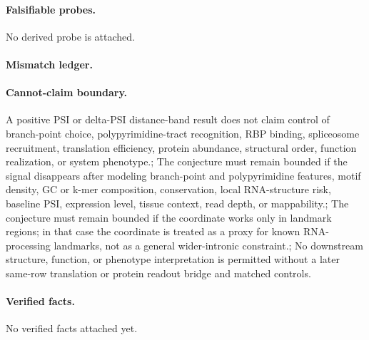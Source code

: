 \paragraph{Falsifiable probes.}
No derived probe is attached.

\paragraph{Mismatch ledger.}
\paragraph{Cannot-claim boundary.} A positive PSI or delta-PSI distance-band result does not claim control of branch-point choice, polypyrimidine-tract recognition, RBP binding, spliceosome recruitment, translation efficiency, protein abundance, structural order, function realization, or system phenotype.; The conjecture must remain bounded if the signal disappears after modeling branch-point and polypyrimidine features, motif density, GC or k-mer composition, conservation, local RNA-structure risk, baseline PSI, expression level, tissue context, read depth, or mappability.; The conjecture must remain bounded if the coordinate works only in landmark regions; in that case the coordinate is treated as a proxy for known RNA-processing landmarks, not as a general wider-intronic constraint.; No downstream structure, function, or phenotype interpretation is permitted without a later same-row translation or protein readout bridge and matched controls.

\paragraph{Verified facts.}
No verified facts attached yet.
